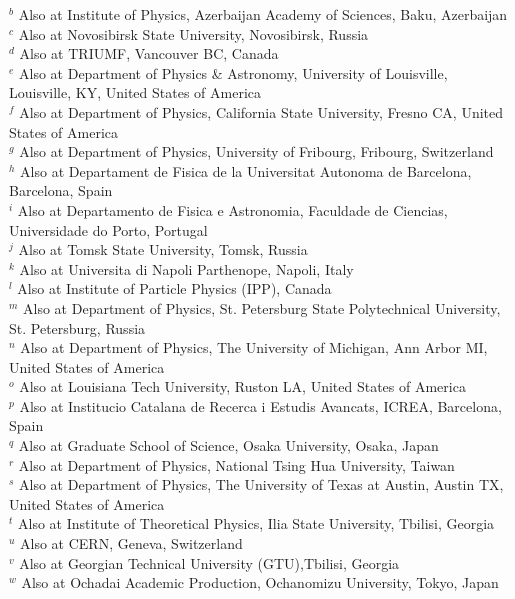 \begin{flushleft}
$^{b}$ Also at Institute of Physics, Azerbaijan Academy of Sciences, Baku, Azerbaijan\\
$^{c}$ Also at Novosibirsk State University, Novosibirsk, Russia\\
$^{d}$ Also at TRIUMF, Vancouver BC, Canada\\
$^{e}$ Also at Department of Physics {\&} Astronomy, University of Louisville, Louisville, KY, United States of America\\
$^{f}$ Also at Department of Physics, California State University, Fresno CA, United States of America\\
$^{g}$ Also at Department of Physics, University of Fribourg, Fribourg, Switzerland\\
$^{h}$ Also at Departament de Fisica de la Universitat Autonoma de Barcelona, Barcelona, Spain\\
$^{i}$ Also at Departamento de Fisica e Astronomia, Faculdade de Ciencias, Universidade do Porto, Portugal\\
$^{j}$ Also at Tomsk State University, Tomsk, Russia\\
$^{k}$ Also at Universita di Napoli Parthenope, Napoli, Italy\\
$^{l}$ Also at Institute of Particle Physics (IPP), Canada\\
$^{m}$ Also at Department of Physics, St. Petersburg State Polytechnical University, St. Petersburg, Russia\\
$^{n}$ Also at Department of Physics, The University of Michigan, Ann Arbor MI, United States of America\\
$^{o}$ Also at Louisiana Tech University, Ruston LA, United States of America\\
$^{p}$ Also at Institucio Catalana de Recerca i Estudis Avancats, ICREA, Barcelona, Spain\\
$^{q}$ Also at Graduate School of Science, Osaka University, Osaka, Japan\\
$^{r}$ Also at Department of Physics, National Tsing Hua University, Taiwan\\
$^{s}$ Also at Department of Physics, The University of Texas at Austin, Austin TX, United States of America\\
$^{t}$ Also at Institute of Theoretical Physics, Ilia State University, Tbilisi, Georgia\\
$^{u}$ Also at CERN, Geneva, Switzerland\\
$^{v}$ Also at Georgian Technical University (GTU),Tbilisi, Georgia\\
$^{w}$ Also at Ochadai Academic Production, Ochanomizu University, Tokyo, Japan\\

\end{flushleft}
